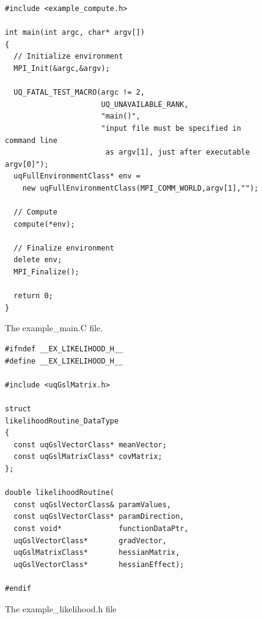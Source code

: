 \begin{figure}[h!]
\begin{center}
\begin{verbatim}
#include <example_compute.h>

int main(int argc, char* argv[])
{
  // Initialize environment
  MPI_Init(&argc,&argv);

  UQ_FATAL_TEST_MACRO(argc != 2,
                      UQ_UNAVAILABLE_RANK,
                      "main()",
                      "input file must be specified in command line
                       as argv[1], just after executable argv[0]");
  uqFullEnvironmentClass* env =
    new uqFullEnvironmentClass(MPI_COMM_WORLD,argv[1],"");

  // Compute
  compute(*env);

  // Finalize environment
  delete env;
  MPI_Finalize();

  return 0;
}
\end{verbatim}
\end{center}
\caption{
The example\_main.C file.
}
\label{fig-main-c}
\end{figure}

\begin{figure}[h!]
\begin{center}
\begin{verbatim}
#ifndef __EX_LIKELIHOOD_H__
#define __EX_LIKELIHOOD_H__

#include <uqGslMatrix.h>

struct
likelihoodRoutine_DataType
{
  const uqGslVectorClass* meanVector;
  const uqGslMatrixClass* covMatrix;
};

double likelihoodRoutine(
  const uqGslVectorClass& paramValues,
  const uqGslVectorClass* paramDirection,
  const void*             functionDataPtr,
  uqGslVectorClass*       gradVector,
  uqGslMatrixClass*       hessianMatrix,
  uqGslVectorClass*       hessianEffect);

#endif
\end{verbatim}
\end{center}
\caption{
The example\_likelihood.h file
}
\label{fig-like-h}
\end{figure}

